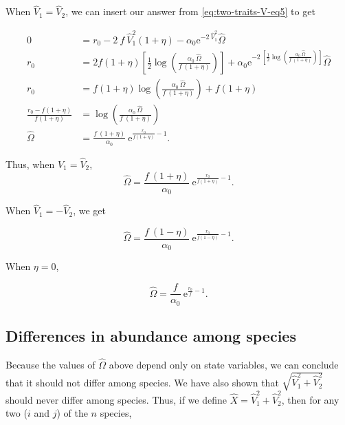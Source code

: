 \noindent When $\hat{V}_1 = \hat{V}_2$, we can insert our answer from
\ref{eq:two-traits-V-eq5} to get

\begin{equation*}
\begin{split}
    0 &= r_0 - 2 ~ f ~ \hat{V}_{1}^2 ( 1 + \eta ) -
        \alpha_0 \textrm{e}^{ -2 ~ \hat{V}_{1}^2 } \hat{\Omega} \\
    r_0 &= 2 f ( 1 + \eta ) \left[
        \frac{1}{2}
        \log \left( \frac{ \alpha_0 ~ \hat{\Omega} }{ f ~ ( 1 + \eta ) } \right)
    \right] +
        \alpha_0 \textrm{e}^{ -2 ~
            \left[
                \frac{1}{2} \log \left(
                    \frac{ \alpha_0 ~ \hat{\Omega} }{ f ~ ( 1 + \eta ) }
                \right)
            \right]
        } \hat{\Omega} \\
    r_0 &= f ( 1 + \eta ) \log \left(
        \frac{ \alpha_0 ~ \hat{\Omega} }{ f ~ ( 1 + \eta ) }
    \right) + f ( 1 + \eta ) \\
    \frac{  r_0 - f ( 1 + \eta ) }{ f ( 1 + \eta ) } &=
        \log \left(
        \frac{ \alpha_0 ~ \hat{\Omega} }{ f ~ ( 1 + \eta ) }
        \right) \\
    \hat{\Omega} &= \frac{ f ~ ( 1 + \eta ) }{ \alpha_0 } ~
        \textrm{e}^{\frac{  r_0 }{ f ( 1 + \eta ) } - 1 }
    \textrm{.}
\end{split}
\end{equation*}

Thus, when $\hat{V}_1 = \hat{V}_2$,
$$
\hat{\Omega} = \frac{ f ~ ( 1 + \eta ) }{ \alpha_0 } ~
        \textrm{e}^{\frac{ r_0 }{ f ( 1 + \eta ) } - 1 }
    \textrm{.}
$$


\noindent When $\hat{V}_1 = -\hat{V}_2$, we get

$$
    \hat{\Omega} = \frac{ f ~ ( 1 - \eta ) }{ \alpha_0 } ~
        \textrm{e}^{\frac{  r_0 }{ f ( 1 - \eta ) } - 1 }
    \textrm{.}
$$


\noindent When $\eta = 0$,

$$
    \hat{\Omega} = \frac{ f }{ \alpha_0 } ~ \textrm{e}^{\frac{ r_0 }{ f } - 1 }
    \textrm{.}
$$



\subsection*{Differences in abundance among species}

Because the values of $\hat{\Omega}$ above depend only on state variables,
we can conclude that it should not differ among species.
We have also shown that $\sqrt{\hat{V}_1^2 + \hat{V}_2^2}$ should never
differ among species.
Thus, if we define $\hat{X} = \hat{V}_1^2 + \hat{V}_2^2$,
then for any two ($i$ and $j$) of the $n$ species,

